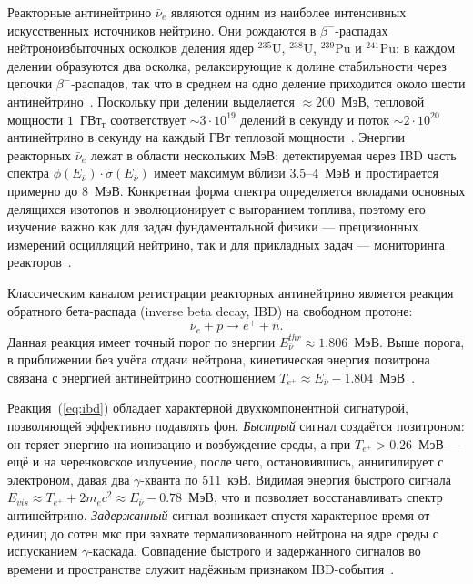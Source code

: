 \documentclass[a4paper,12pt]{extarticle}
\begin{document}
Реакторные антинейтрино $\bar{\nu}_e$ являются одним из наиболее интенсивных искусственных источников нейтрино. Они рождаются в $\beta^-$-распадах нейтроноизбыточных осколков деления ядер $^{235}$U, $^{238}$U, $^{239}$Pu и $^{241}$Pu: в каждом делении образуются два осколка, релаксирующие к долине стабильности через цепочки $\beta^-$-распадов, так что в среднем на одно деление приходится около шести антинейтрино~\cite{bemporad2002}. Поскольку при делении выделяется $\approx 200$~МэВ, тепловой мощности $1$~ГВт$_{\text{т}}$ соответствует $\sim 3\cdot 10^{19}$ делений в секунду и поток $\sim 2\cdot 10^{20}$ антинейтрино в секунду на каждый ГВт тепловой мощности~\cite{bemporad2002}. Энергии реакторных $\bar{\nu}_e$ лежат в области нескольких МэВ; детектируемая через IBD часть спектра $\phi(E_{\bar{\nu}})\cdot\sigma(E_{\bar{\nu}})$ имеет максимум вблизи $3.5$--$4$~МэВ и простирается примерно до $8$~МэВ. Конкретная форма спектра определяется вкладами основных делящихся изотопов и эволюционирует с выгоранием топлива, поэтому его изучение важно как для задач фундаментальной физики — прецизионных измерений осцилляций нейтрино, так и для прикладных задач — мониторинга реакторов~\cite{huber2011,mueller2011}.

Классическим каналом регистрации реакторных антинейтрино является реакция обратного бета-распада (inverse beta decay, IBD) на свободном протоне:
\begin{equation}
    \bar{\nu}_e + p \rightarrow e^+ + n.
    \label{eq:ibd}
\end{equation}
Данная реакция имеет точный порог по энергии $E^{thr}_{\bar{\nu}}\approx 1.806$~МэВ. Выше порога, в приближении без учёта отдачи нейтрона, кинетическая энергия позитрона связана с энергией антинейтрино соотношением $T_{e^+}\approx E_{\bar{\nu}}-1.804$~МэВ~\cite{vogel1999}.

Реакция~(\ref{eq:ibd}) обладает характерной двухкомпонентной сигнатурой, позволяющей эффективно подавлять фон. \emph{Быстрый} сигнал создаётся позитроном: он теряет энергию на ионизацию и возбуждение среды, а при $T_{e^+}>0.26$~МэВ — ещё и на черенковское излучение, после чего, остановившись, аннигилирует с электроном, давая два $\gamma$-кванта по $511$~кэВ. Видимая энергия быстрого сигнала $E_{vis}\approx T_{e^+}+2m_ec^2\approx E_{\bar{\nu}}-0.78$~МэВ, что и позволяет восстанавливать спектр антинейтрино. \emph{Задержанный} сигнал возникает спустя характерное время от единиц до сотен мкс при захвате термализованного нейтрона на ядре среды с испусканием $\gamma$-каскада. Совпадение быстрого и задержанного сигналов во времени и пространстве служит надёжным признаком IBD-события~\cite{vogel1999,strumia2003}.
\end{document}
